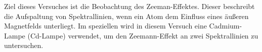 Ziel dieses Versuches ist die Beobachtung des Zeeman-Effektes.
Dieser beschreibt die Aufspaltung von Spektrallinien, wenn ein Atom dem Einfluss
eines äußeren Magnetfelds unterliegt.
Im speziellen wird in diesem Versuch eine Cadmium-Lampe (Cd-Lampe) verwendet,
um den Zeemann-Effekt an zwei Spektrallinien zu untersuchen.

